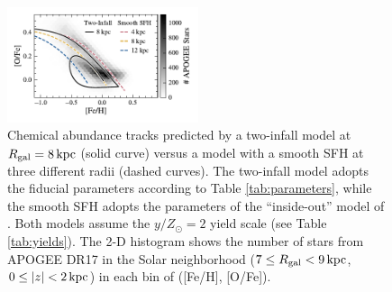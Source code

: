\documentclass[twocolumn,twocolappendix,linenumbers]{aastex631}
\newcommand{\yZ}[1]{$y/Z_\odot=#1$}
\newcommand{\kpc}{\,{\rm kpc}}
\begin{document}
\begin{figure}
    \centering
    \includegraphics[width=0.5\textwidth]{figures/smooth_vs_twoinfall.pdf}
    \caption{Chemical abundance tracks predicted by a two-infall model at $R_{\rm gal}=8\kpc$ (solid curve) versus a model with a smooth SFH at three different radii (dashed curves). The two-infall model adopts the fiducial parameters according to Table \ref{tab:parameters}, while the smooth SFH adopts the parameters of the ``inside-out'' model of \citet{johnson_stellar_2021}. Both models assume the \yZ{2} yield scale (see Table \ref{tab:yields}). The 2-D histogram shows the number of stars from APOGEE DR17 in the Solar neighborhood ($7\leq R_{\rm gal}<9\kpc$, $0\leq|z|<2\kpc$) in each bin of ([Fe/H], [O/Fe]).}
    \label{fig:smooth-vs-twoinfall}
\end{figure}
\end{document}
